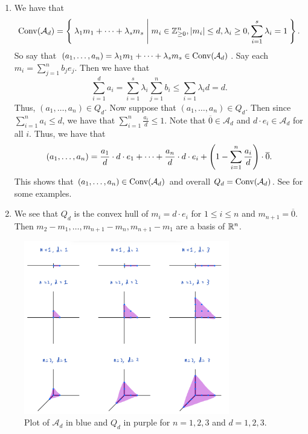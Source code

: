 \documentclass[letterpaper, 11pt, oneside]{book}
\begin{document}
\begin{sol}\label{ex:UAG_7.1.2}
  \begin{enumerate}
    \item We have that
          \[
            \operatorname{Conv}(\mathcal{A}_{d}) = \Set{\lambda_{1}m_{1} + \cdots + \lambda_{s}m_{s} | m_{i} \in \mathbb{Z}_{\geq 0}^{n}, \abs{m_{i}} \leq d, \lambda_{i} \geq 0, \sum_{i = 1}^{s} \lambda_{i} = 1}.
          \]
          So say that $(a_{1}, \ldots, a_{n}) = \lambda_{1}m_{1} + \cdots + \lambda_{s}m_{s} \in \operatorname{Conv}(\mathcal{A}_{d})$.
          Say each $m_{i} = \sum_{j = 1}^{n} b_{j}e_{j}$.
          Then we have that
          \[
            \sum_{i = 1}^{d} a_{i} = \sum_{i = 1}^{s} \lambda_{i} \sum_{j = 1}^{n} b_{i} \leq \sum_{i = 1} \lambda_{i} d = d.
          \]
          Thus, $(a_{1}, \ldots, a_{n}) \in Q_{d}$.
          Now suppose that $(a_{1}, \ldots, a_{n}) \in Q_{d}$.
          Then since $\sum_{i = 1}^{n} a_{i} \leq d$, we have that $\sum_{i = 1}^{n} \frac{a_{i}}{d} \leq 1$.
          Note that $\overline{0} \in \mathcal{A}_{d}$ and $d \cdot e_{i} \in \mathcal{A}_{d}$ for all $i$.
          Thus, we have that
          \[
            (a_{1}, \ldots, a_{n}) = \frac{a_{1}}{d} \cdot d \cdot e_{1} + \cdots + \frac{a_{n}}{d} \cdot d \cdot e_{i} + \pqty{1 - \sum_{i = 1}^{n} \frac{a_{i}}{d}} \cdot \overline{0}.
          \]
          This shows that $(a_{1}, \ldots, a_{n}) \in \operatorname{Conv}(\mathcal{A}_{d})$ and overall $Q_{d} = \operatorname{Conv}(\mathcal{A}_{d})$.
          See  for some examples.
    \item We see that $Q_{d}$ is the convex hull of $m_{i} = d \cdot e_{i}$ for $1 \leq i \leq n$ and $m_{n + 1} = \overline{0}$.
          Then $m_{2} - m_{1}, \ldots, m_{n + 1} - m_{n}, m_{n + 1} - m_{1}$ are a basis of $\mathbb{R}^{n}$.
  \end{enumerate}
\end{sol}

\clearpage

\begin{figure}
  \centering
  \includegraphics[width=0.8\textwidth]{figs/7-1-2a.png}
  \caption{Plot of $\mathcal{A}_{d}$ in blue and $Q_{d}$ in purple for $n = 1, 2, 3$ and $d = 1, 2, 3$.}\label{fig:7-1-2a_plot}
\end{figure}

\clearpage

\printbibliography
\end{document}
